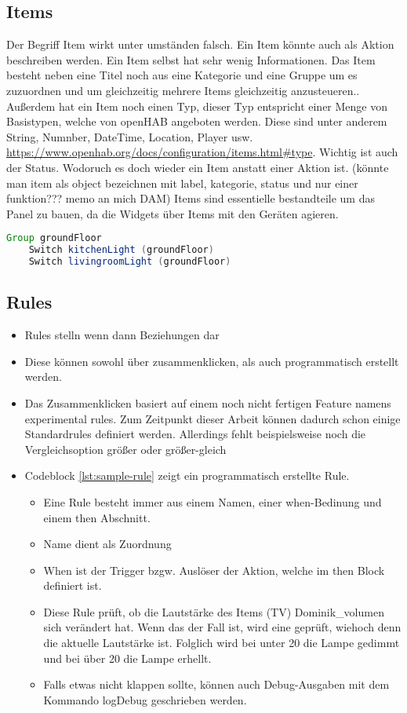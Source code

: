 \subsection{Items}
Der Begriff Item wirkt unter umständen falsch. Ein Item könnte auch als Aktion beschreiben werden. Ein Item selbst hat sehr wenig Informationen. Das Item besteht neben eine Titel noch aus eine Kategorie und eine Gruppe um es zuzuordnen und um gleichzeitig mehrere Items gleichzeitig anzusteueren.. Außerdem hat ein Item noch einen Typ, dieser Typ entspricht einer Menge von Basistypen, welche von openHAB angeboten werden. Diese sind unter anderem String, Numnber, DateTime, Location, Player usw. \url{https://www.openhab.org/docs/configuration/items.html#type}.
Wichtig ist auch der Status. Wodoruch es doch wieder ein Item anstatt einer Aktion ist. (könnte man item als object bezeichnen mit label, kategorie, status und nur einer funktion??? memo an mich DAM)
Items sind essentielle bestandteile um das Panel zu bauen, da die Widgets über Items mit den Geräten agieren.


\begin{lstlisting}[language=java,firstnumber=1,caption=Item-Gruppierung Beispiel,label=lst:group-items]
	Group groundFloor
	Switch kitchenLight (groundFloor)
	Switch livingroomLight (groundFloor)
\end{lstlisting}

\subsection{Rules}
\begin{itemize}
	\item Rules stelln wenn dann Beziehungen dar
	\item Diese können sowohl über zusammenklicken, als auch programmatisch erstellt werden. 
	\item Das Zusammenklicken basiert auf einem noch nicht fertigen Feature namens experimental rules. Zum Zeitpunkt dieser Arbeit können dadurch schon einige Standardrules definiert werden. Allerdings fehlt beispielsweise noch die Vergleichsoption größer oder größer-gleich
	\item Codeblock \ref{lst:sample-rule} zeigt ein programmatisch erstellte Rule.
	\begin{itemize}
		\item Eine Rule besteht immer aus einem Namen, einer when-Bedinung und einem then Abschnitt.
		\item Name dient als Zuordnung
		\item When ist der Trigger bzgw. Auslöser der Aktion, welche im then Block definiert ist.
		\item Diese Rule prüft, ob die Lautstärke des Items (TV) Dominik\_volumen sich verändert hat.
		Wenn das der Fall ist, wird eine geprüft, wiehoch denn die aktuelle Lautstärke ist.
		Folglich wird bei unter 20 die Lampe gedimmt und bei über 20 die Lampe erhellt.
		\item Falls etwas nicht klappen sollte, können auch Debug-Ausgaben mit dem Kommando logDebug geschrieben werden.
	\end{itemize}
\end{itemize}

